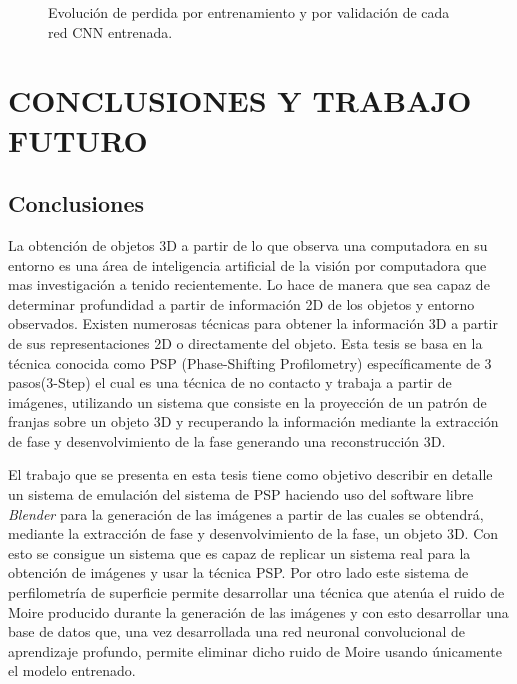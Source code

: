 \documentclass[10pt,letterpaper]{article}
\begin{document}
\begin{figure}[H]
      \begin{center}
        \caption{Evolución de perdida por entrenamiento y por validación de cada red CNN entrenada.}
        \label{tif157}
      \end{center}
\end{figure}


\section{CONCLUSIONES Y TRABAJO FUTURO}
\subsection{Conclusiones}

La obtención de objetos 3D a partir de lo que observa una computadora en su entorno es una área de inteligencia artificial de la visión por computadora que mas investigación a tenido recientemente. Lo hace de manera que sea capaz de determinar profundidad a partir de información 2D de los objetos y entorno observados. Existen numerosas técnicas para obtener la información 3D a partir de sus representaciones 2D o directamente del objeto. Esta tesis se basa en la técnica conocida como PSP (Phase-Shifting Profilometry) específicamente de 3 pasos(3-Step) el cual es una técnica de no contacto y trabaja a partir de imágenes, utilizando un sistema que consiste en la proyección de un patrón de franjas sobre un objeto 3D y recuperando la información mediante la extracción de fase y desenvolvimiento de la fase generando una reconstrucción 3D.

El trabajo que se presenta en esta tesis tiene como objetivo describir en detalle un sistema de emulación del sistema de PSP haciendo uso del software libre \textit{Blender} para la generación de las imágenes a partir de las cuales se obtendrá, mediante la extracción de fase y desenvolvimiento de la fase, un objeto 3D. Con esto se consigue un sistema que es capaz de replicar un sistema real para la obtención de imágenes y usar la técnica PSP. Por otro lado este sistema de perfilometría de superficie permite desarrollar una técnica que atenúa el ruido de Moire producido durante la generación de las imágenes y con esto desarrollar una base de datos que, una vez desarrollada una red neuronal convolucional de aprendizaje profundo, permite eliminar dicho ruido de Moire usando únicamente el modelo entrenado.
\end{document}
